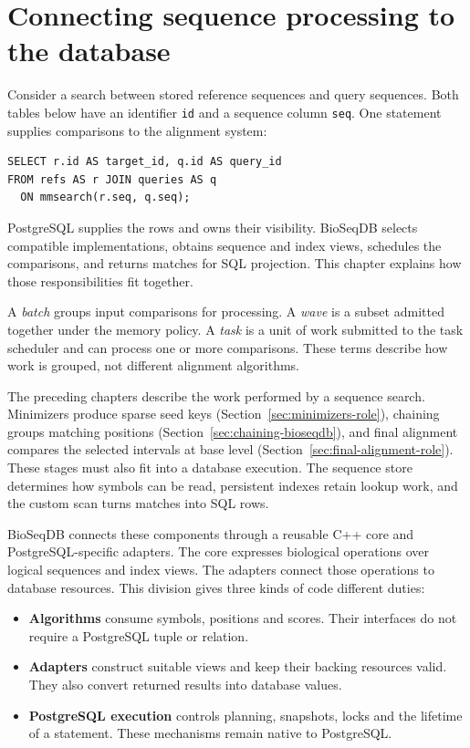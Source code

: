 \section{Connecting sequence processing to the database}
\label{sec:arch-core-boundaries}

Consider a search between stored reference sequences and query sequences.
Both tables below have an identifier \texttt{id} and a sequence column
\texttt{seq}. One statement supplies comparisons to the alignment system:

\noindent\begin{minipage}{\linewidth}
\begin{lstlisting}[style=bioseq-arch-sql,
  caption={A sequence join connects SQL input to the processing core.},
  label={lst:arch-opening-query}]
SELECT r.id AS target_id, q.id AS query_id
FROM refs AS r JOIN queries AS q
  ON mmsearch(r.seq, q.seq);
\end{lstlisting}
\end{minipage}

PostgreSQL supplies the rows and owns their visibility. BioSeqDB selects
compatible implementations, obtains sequence and index views, schedules the
comparisons, and returns matches for SQL projection. This chapter explains
how those responsibilities fit together.

A \emph{batch} groups input comparisons for processing. A \emph{wave} is a
subset admitted together under the memory policy. A \emph{task} is a unit of
work submitted to the task scheduler and can process one or more comparisons.
These terms describe how work is grouped, not different alignment algorithms.

The preceding chapters describe the work performed by a sequence search.
Minimizers produce sparse seed keys
(Section~\ref{sec:minimizers-role}), chaining groups matching positions
(Section~\ref{sec:chaining-bioseqdb}), and final alignment compares the selected
intervals at base level (Section~\ref{sec:final-alignment-role}). These stages
must also fit into a database execution. The sequence store determines how
symbols can be read, persistent indexes retain lookup work, and the custom
scan turns matches into SQL rows.

BioSeqDB connects these components through a reusable C++ core and
PostgreSQL-specific adapters. The core expresses biological operations over
logical sequences and index views. The adapters connect those operations to
database resources. This division gives three kinds of code different duties:
\begin{itemize}
  \item \textbf{Algorithms} consume symbols, positions and scores. Their
    interfaces do not require a PostgreSQL tuple or relation.
  \item \textbf{Adapters} construct suitable views and keep their backing
    resources valid. They also convert returned results into database values.
  \item \textbf{PostgreSQL execution} controls planning, snapshots, locks and
    the lifetime of a statement. These mechanisms remain native to PostgreSQL.
\end{itemize}


